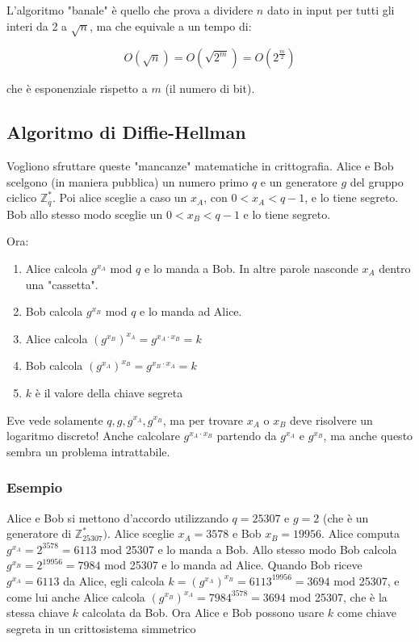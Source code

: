 L'algoritmo "banale" è quello che prova a dividere $n$ dato in input per tutti gli interi da 2 a $\sqrt{n}$, ma che equivale a un tempo di:

\begin{equation*}
	O(\sqrt{n}) = O(\sqrt{2^m}) = O(2^{\frac{m}{2}})
\end{equation*}

che è esponenziale rispetto a $m$ (il numero di bit).

\subsection*{Algoritmo di Diffie-Hellman}

Vogliono sfruttare queste "mancanze" matematiche in crittografia. Alice e Bob scelgono (in maniera pubblica) un numero primo $q$ e un generatore $g$ del gruppo ciclico $\mathbb{Z}_q^*$. Poi alice sceglie a caso un $x_A$, con $0<x_A<q-1$, e lo tiene segreto. Bob allo stesso modo sceglie un $0 < x_B < q-1$ e lo tiene segreto.

Ora:
\begin{enumerate}
	\item Alice calcola $g^{x_A}$ mod $q$ e lo manda a Bob. In altre parole nasconde $x_A$ dentro una "cassetta".
	\item Bob calcola $g^{x_B}$ mod $q$ e lo manda ad Alice.
	\item Alice calcola $(g^{x_B})^{x_A} = g^{x_A \cdot x_B} = k$
	\item Bob calcola $(g^{x_A})^{x_B} = g^{x_B \cdot x_A} = k$ 
	\item $k$ è il valore della chiave segreta
\end{enumerate}
Eve vede solamente $q, g, g^{x_A}, g^{x_B}$, ma per trovare $x_A$ o $x_B$ deve risolvere un logaritmo discreto! Anche calcolare $g^{x_A \cdot x_B}$ partendo da $g^{x_A}$ e $g^{x_B}$, ma anche questo sembra un problema intrattabile.

\subsubsection*{Esempio}

Alice e Bob si mettono d'accordo utilizzando $q=25307$ e $g=2$ (che è un generatore di $\mathbb{Z}_{25307}^*)$.
Alice sceglie $x_A = 3578$ e Bob $x_B = 19956$.
Alice computa $g^{x_A} = 2^{3578} = 6113$ mod 25307 e lo manda a Bob. Allo stesso modo Bob calcola $g^{x_B} = 2^{19956} = 7984$ mod 25307 e lo manda ad Alice.
Quando Bob riceve $g^{x_A} = 6113$ da Alice, egli calcola $k=(g^{x_A})^{x_B} = 6113^{19956} = 3694$ mod 25307, e come lui anche Alice calcola $(g^{x_B})^{x_A} = 7984^{3578} = 3694$ mod 25307, che è la stessa chiave $k$ calcolata da Bob.
Ora Alice e Bob possono usare $k$ come chiave segreta in un crittosistema simmetrico

